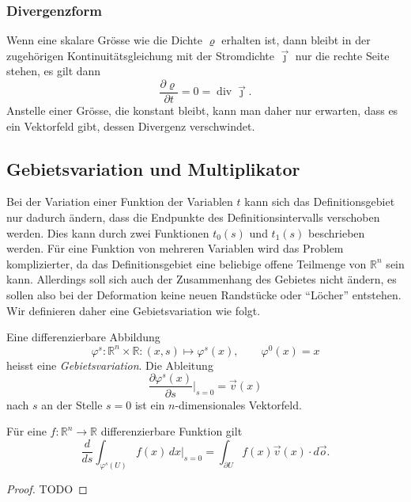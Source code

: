 %
%
\subsubsection{Divergenzform}
Wenn eine skalare Grösse wie die Dichte $\varrho$ erhalten ist, dann bleibt
in der zugehörigen Kontinuitätsgleichung mit der Stromdichte
$\vec{\jmath}$ nur die rechte Seite stehen, es gilt dann
\[
\frac{\partial\varrho}{\partial t}
=
0
=
\operatorname{div} \vec{\jmath}.
\]
Anstelle einer Grösse, die konstant bleibt, kann man daher nur erwarten,
dass es ein Vektorfeld gibt, dessen Divergenz verschwindet.

%
%
\subsection{Gebietsvariation und Multiplikator}
Bei der Variation einer Funktion der Variablen $t$ kann sich das
Definitionsgebiet nur dadurch ändern, dass die Endpunkte des
Definitionsintervalls verschoben werden.
Dies kann durch zwei Funktionen $t_0(s)$ und $t_1(s)$ beschrieben werden.
Für eine Funktion von mehreren Variablen wird das Problem komplizierter,
da das Definitionsgebiet eine beliebige offene Teilmenge von $\mathbb{R}^n$
sein kann.
Allerdings soll sich auch der Zusammenhang des Gebietes nicht ändern,
es sollen also bei der Deformation keine neuen Randstücke oder ``Löcher''
entstehen.
Wir definieren daher eine Gebietsvariation wie folgt.

\begin{definition}
Eine differenzierbare Abbildung
\[
\varphi^s
\colon
\mathbb{R}^n\times \mathbb{R}
:
(x,s)
\mapsto
\varphi^s(x),
\qquad
\varphi^0(x)=x
\]
heisst eine {\em Gebietsvariation}.
%
Die Ableitung
\[
\frac{\partial \varphi^s(x)}{\partial s}\bigg|_{s=0}
=
\vec{v}(x)
\]
nach $s$ an der Stelle $s=0$ ist ein $n$-dimensionales Vektorfeld.
\end{definition}

\begin{satz}
\label{buch:symmetrien:felder:satz:gebietsintegral}
Für eine $f\colon \mathbb{R}^n\to\mathbb{R}$ differenzierbare Funktion
gilt
\[
\frac{d}{ds}
\int_{\varphi^s(U)}
f(x)\,dx
\bigg|_{s=0}
=
\int_{\partial U} f(x)\vec{v}(x)\cdot d\vec{o}.
\]
\end{satz}

\begin{proof}
TODO
\end{proof}

